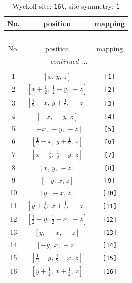 \documentclass[fleqn,8pt]{jsarticle}
\begin{document}
\begin{longtable}{ccc}
\caption{Wyckoff site: {\tt 16l}, site symmetry: {\tt 1}}
 \\
 \hline \hline
No. & position & mapping \\ \hline \endfirsthead

\multicolumn{2}{l}{\tablename\ \thetable{}} \\
 \hline \hline
No. & position & mapping \\ \hline \endhead

 \hline \hline
\multicolumn{2}{r}{\footnotesize\it continued ...} \\ \endfoot

 \hline \hline
\multicolumn{2}{r}{} \\ \endlastfoot

1 & $\left[ x,\, y,\, z \right]$ & {\tt [1]} \\ \hline
2 & $\left[ x + \frac{1}{2},\, \frac{1}{2} - y,\, - z \right]$ & {\tt [2]} \\ \hline
3 & $\left[ \frac{1}{2} - x,\, y + \frac{1}{2},\, - z \right]$ & {\tt [3]} \\ \hline
4 & $\left[ - x,\, - y,\, z \right]$ & {\tt [4]} \\ \hline
5 & $\left[ - x,\, - y,\, - z \right]$ & {\tt [5]} \\ \hline
6 & $\left[ \frac{1}{2} - x,\, y + \frac{1}{2},\, z \right]$ & {\tt [6]} \\ \hline
7 & $\left[ x + \frac{1}{2},\, \frac{1}{2} - y,\, z \right]$ & {\tt [7]} \\ \hline
8 & $\left[ x,\, y,\, - z \right]$ & {\tt [8]} \\ \hline
9 & $\left[ - y,\, x,\, z \right]$ & {\tt [9]} \\ \hline
10 & $\left[ y,\, - x,\, z \right]$ & {\tt [10]} \\ \hline
11 & $\left[ y + \frac{1}{2},\, x + \frac{1}{2},\, - z \right]$ & {\tt [11]} \\ \hline
12 & $\left[ \frac{1}{2} - y,\, \frac{1}{2} - x,\, - z \right]$ & {\tt [12]} \\ \hline
13 & $\left[ y,\, - x,\, - z \right]$ & {\tt [13]} \\ \hline
14 & $\left[ - y,\, x,\, - z \right]$ & {\tt [14]} \\ \hline
15 & $\left[ \frac{1}{2} - y,\, \frac{1}{2} - x,\, z \right]$ & {\tt [15]} \\ \hline
16 & $\left[ y + \frac{1}{2},\, x + \frac{1}{2},\, z \right]$ & {\tt [16]} \\
\end{longtable}
\end{document}
